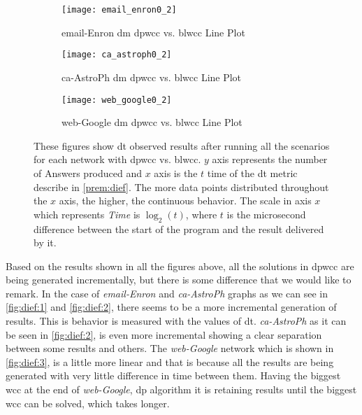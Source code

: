 \begin{figure}[!htp]
  \centering
  \begin{subfigure}[t]{0.3\textwidth}
   \texttt{[image: email\_enron0\_2]}
   \caption{email-Enron \acrlong{dm} \acrshort{dpwcc} vs. \acrshort{blwcc} Line Plot}
    \label{fig:dief:1}
  \end{subfigure}\hfill
  \begin{subfigure}[t]{0.3\textwidth}
   \texttt{[image: ca\_astroph0\_2]}
   \caption{ca-AstroPh \acrlong{dm} \acrshort{dpwcc} vs. \acrshort{blwcc} Line Plot}
    \label{fig:dief:2}
  \end{subfigure}\hfill
  \begin{subfigure}[t]{0.3\textwidth}
   \texttt{[image: web\_google0\_2]}
   \caption{web-Google \acrlong{dm} \acrshort{dpwcc} vs. \acrshort{blwcc} Line Plot}
    \label{fig:dief:3}
  \end{subfigure}\hfill
   \caption{These figures show \acrshort{dt} observed results after running all the scenarios for each network with \acrshort{dpwcc} vs. \acrshort{blwcc}. $y$ axis represents the number of Answers produced and $x$ axis is the $t$ time of the \acrshort{dt} metric describe in \autoref{prem:dief}. The more data points distributed throughout the $x$ axis, the higher, the continuous behavior. The scale in axis $x$ which represents \textit{Time} is $\log_{2}(t)$, where $t$ is the microsecond difference between the start of the program and the result delivered by it.}
   \label{fig:dief:old:all}
 \end{figure}


Based on the results shown in all the figures above, all the solutions in \acrshort{dpwcc} are being generated incrementally, but there is some difference that we would like to remark. 
In the case of \emph{email-Enron} and \emph{ca-AstroPh} graphs as we can see in \autoref{fig:dief:1} and \autoref{fig:dief:2}, there seems to be a more incremental generation of results. 
This is behavior is measured with the values of \acrfull{dt}. \emph{ca-AstroPh} as it can be seen in \autoref{fig:dief:2}, is even more incremental showing a clear separation between some results and others. 
The \emph{web-Google} network which is shown in \autoref{fig:dief:3}, is a little more linear and that is because all the results are being generated with very little difference in time between them. 
Having the biggest \acrshort{wcc} at the end of \emph{web-Google}, \acrshort{dp} algorithm it is retaining results until the biggest \acrshort{wcc} can be solved, which takes longer. 


